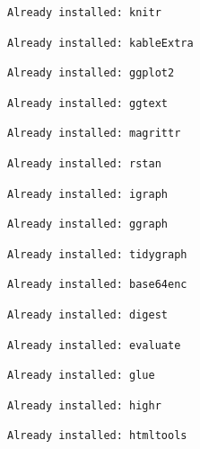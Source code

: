 \documentclass[
  12,
  letterpaper,
  DIV=11,
  numbers=noendperiod]{scrartcl}
\begin{document}
\begin{verbatim}
Already installed: knitr
\end{verbatim}

\begin{verbatim}
Already installed: kableExtra
\end{verbatim}

\begin{verbatim}
Already installed: ggplot2
\end{verbatim}

\begin{verbatim}
Already installed: ggtext
\end{verbatim}

\begin{verbatim}
Already installed: magrittr
\end{verbatim}

\begin{verbatim}
Already installed: rstan
\end{verbatim}

\begin{verbatim}
Already installed: igraph
\end{verbatim}

\begin{verbatim}
Already installed: ggraph
\end{verbatim}

\begin{verbatim}
Already installed: tidygraph
\end{verbatim}

\begin{verbatim}
Already installed: base64enc
\end{verbatim}

\begin{verbatim}
Already installed: digest
\end{verbatim}

\begin{verbatim}
Already installed: evaluate
\end{verbatim}

\begin{verbatim}
Already installed: glue
\end{verbatim}

\begin{verbatim}
Already installed: highr
\end{verbatim}

\begin{verbatim}
Already installed: htmltools
\end{verbatim}
\end{document}
